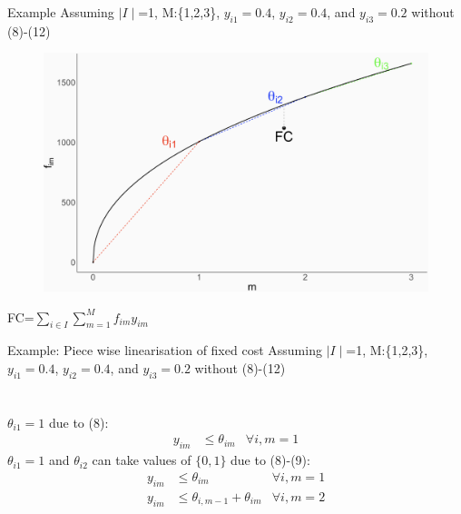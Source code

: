 \documentclass[xcolor=dvipsnames,aspectratio=169, handout, mathserif]{beamer}
\begin{document}
\begin{frame}{Example}
    Assuming $\mid I \mid$=1, M:\{1,2,3\}, $y_{i1}=0.4$, $y_{i2}=0.4$, and $y_{i3}=0.2$ without (8)-(12)
    \vspace{-2mm}
   \begin{center}
\begin{figure}
    \centering
    \includegraphics[width=0.7\linewidth]{cr_FC.png}
\end{figure}
\end{center}
 \vspace{-7mm}
FC=$\sum_{i \in I} \sum_{m=1}^M f_{im} y_{im}$
\end{frame}

\begin{frame}{Example: Piece wise linearisation of fixed cost }
    Assuming $\mid I \mid$=1, M:\{1,2,3\}, $y_{i1}=0.4$, $y_{i2}=0.4$, and $y_{i3}=0.2$ without (8)-(12)\\ \\ \\
   $ \theta_{i1}=1 $ due to (8):
       \begin{align*}
        y_{im} &\leq \theta_{im} & \forall i, m = 1
    \end{align*}
    $\theta_{i1}=1$ and $\theta_{i2}$ can take values of $\{0,1\}$ due to (8)-(9):
       \begin{align*}
        y_{im} &\leq \theta_{im} & \forall i, m = 1\\
        y_{im} &\leq \theta_{i,m-1} + \theta_{im}  & \forall i, m = 2 
    \end{align*}
\end{frame}
\end{document}
